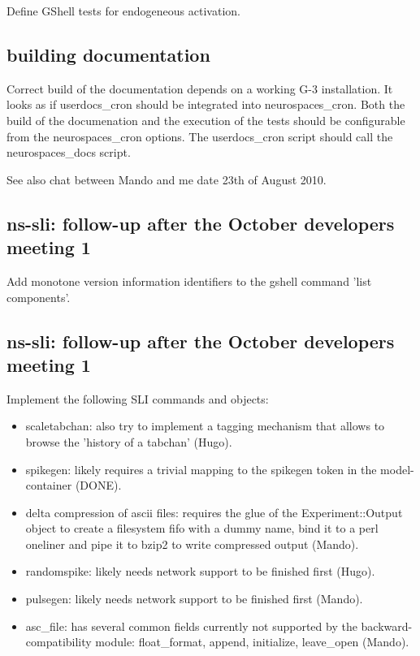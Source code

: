 \documentclass[12pt]{article}
\begin{document}
Define GShell tests for endogeneous activation.


\subsection{building documentation}

Correct build of the documentation depends on a working G-3
installation.  It looks as if userdocs\_cron should be integrated into
neurospaces\_cron.  Both the build of the documenation and the
execution of the tests should be configurable from the
neurospaces\_cron options.  The userdocs\_cron script should call the
neurospaces\_docs script.

See also chat between Mando and me date 23th of August 2010.


\subsection{ns-sli: follow-up after the October developers meeting 1}

Add monotone version information identifiers to the gshell command
'list components'.


\subsection{ns-sli: follow-up after the October developers meeting 1}

Implement the following SLI commands and objects:

\begin{itemize}
\item scaletabchan: also try to implement a tagging mechanism that
  allows to browse the 'history of a tabchan' (Hugo).
\item spikegen: likely requires a trivial mapping to the spikegen
  token in the model-container (DONE).
\item delta compression of ascii files: requires the glue of the
  Experiment::Output object to create a filesystem fifo with a dummy
  name, bind it to a perl oneliner and pipe it to bzip2 to write
  compressed output (Mando).
\item randomspike: likely needs network support to be finished first
  (Hugo).
\item pulsegen: likely needs network support to be finished first
  (Mando).
\item asc\_file: has several common fields currently not supported by
  the backward-compatibility module: float\_format, append, initialize,
  leave\_open (Mando).
\end{itemize}
\end{document}
